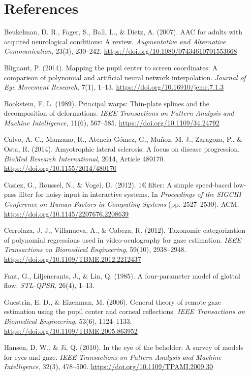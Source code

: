 \documentclass[twocolumn,10pt]{article}
\begin{document}
\section*{References}
\begin{description}
    \item Beukelman, D. R., Fager, S., Ball, L., \& Dietz, A. (2007). AAC for adults with acquired neurological conditions: A review. \textit{Augmentative and Alternative Communication}, 23(3), 230--242. \url{https://doi.org/10.1080/07434610701553668}
    \item Blignaut, P. (2014). Mapping the pupil center to screen coordinates: A comparison of polynomial and artificial neural network interpolation. \textit{Journal of Eye Movement Research}, 7(1), 1--13. \url{https://doi.org/10.16910/jemr.7.1.3}
    \item Bookstein, F. L. (1989). Principal warps: Thin-plate splines and the decomposition of deformations. \textit{IEEE Transactions on Pattern Analysis and Machine Intelligence}, 11(6), 567--585. \url{https://doi.org/10.1109/34.24792}
    \item Calvo, A. C., Manzano, R., Atencia-G{\'o}mez, G., Mu{\~n}oz, M. J., Zaragoza, P., \& Osta, R. (2014). Amyotrophic lateral sclerosis: A focus on disease progression. \textit{BioMed Research International}, 2014, Article 480170. \url{https://doi.org/10.1155/2014/480170}
    \item Casiez, G., Roussel, N., \& Vogel, D. (2012). 1€ filter: A simple speed-based low-pass filter for noisy input in interactive systems. In \textit{Proceedings of the SIGCHI Conference on Human Factors in Computing Systems} (pp. 2527--2530). ACM. \url{https://doi.org/10.1145/2207676.2208639}
    \item Cerrolaza, J. J., Villanueva, A., \& Cabeza, R. (2012). Taxonomic categorization of polynomial regressions used in video-oculography for gaze estimation. \textit{IEEE Transactions on Biomedical Engineering}, 59(10), 2938--2948. \url{https://doi.org/10.1109/TBME.2012.2212437}
    \item Fant, G., Liljencrants, J., \& Lin, Q. (1985). A four-parameter model of glottal flow. \textit{STL-QPSR}, 26(4), 1--13.
    \item Guestrin, E. D., \& Eizenman, M. (2006). General theory of remote gaze estimation using the pupil center and corneal reflections. \textit{IEEE Transactions on Biomedical Engineering}, 53(6), 1124--1133. \url{https://doi.org/10.1109/TBME.2005.863952}
    \item Hansen, D. W., \& Ji, Q. (2010). In the eye of the beholder: A survey of models for eyes and gaze. \textit{IEEE Transactions on Pattern Analysis and Machine Intelligence}, 32(3), 478--500. \url{https://doi.org/10.1109/TPAMI.2009.30}

\end{description}
\end{document}
